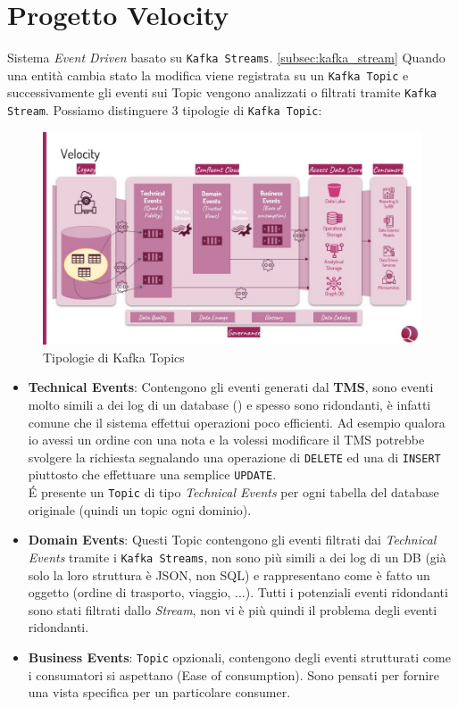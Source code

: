 \section{Progetto Velocity}
\label{sec:T&T_new}
Sistema \textit{Event Driven} basato su \texttt{Kafka Streams}. \ref{subsec:kafka_stream}
Quando una entità cambia stato la modifica viene registrata su un \texttt{Kafka Topic} e successivamente gli eventi sui Topic vengono analizzati o filtrati tramite \texttt{Kafka Stream}.
Possiamo distinguere 3 tipologie di \texttt{Kafka Topic}:
\begin{figure}[H]
    \centering
    \includegraphics[scale=0.5]{images/architecture/confluent_velocity.jpg}
    \caption{Tipologie di Kafka Topics}
    \label{fig:kafka_topics.img}
\end{figure}
\begin{itemize}
    \item \textbf{Technical Events}: Contengono gli eventi generati dal \textbf{TMS}, sono eventi molto simili a dei log di un database () e spesso sono ridondanti, è infatti comune che il sistema effettui operazioni poco efficienti. Ad esempio qualora io avessi un ordine con una nota e la volessi modificare il TMS potrebbe svolgere la richiesta segnalando una operazione di \texttt{DELETE} ed una di \texttt{INSERT} piuttosto che effettuare una semplice \texttt{UPDATE}.\\
    É presente un \texttt{Topic} di tipo \textit{Technical Events} per ogni tabella del database originale (quindi un topic ogni dominio).
    \item \textbf{Domain Events}: Questi Topic contengono gli eventi filtrati dai \textit{Technical Events} tramite i \texttt{Kafka Streams}, non sono più simili a dei log di un DB (già solo la loro struttura è JSON, non SQL) e rappresentano come è fatto un oggetto (ordine di trasporto, viaggio, ...). 
    Tutti i potenziali eventi ridondanti sono stati filtrati dallo \textit{Stream}, non vi è più quindi il problema degli eventi ridondanti.
    \item \textbf{Business Events}: \texttt{Topic} opzionali, contengono degli eventi strutturati come i consumatori si aspettano (Ease of consumption). Sono pensati per fornire una vista specifica per un particolare consumer.
\end{itemize}

